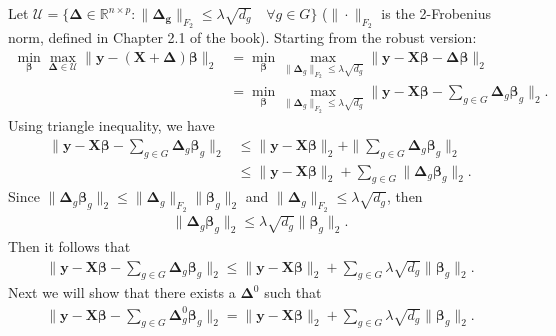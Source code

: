 \documentclass{article}%
\begin{document}
\begin{solution}
Let $\mathcal{U} = \{\mathbf{\Delta} \in \mathbb{R}^{n \times p}: \| \mathbf{\Delta_g} \| _{F_2} \leq \lambda \sqrt{d_g} \quad \forall g \in G \} $ ($\| \cdot \|_{F_2} $ is the 2-Frobenius norm, defined in Chapter 2.1 of the book).
Starting from the robust version:
\begin{align} 
    \min_{\boldsymbol{\beta}} \max_{ \mathbf{\Delta} \in \mathcal{U}} 
    \| \mathbf{y} - (\mathbf{X} + \mathbf{\Delta} )\boldsymbol{\beta} \|_2  
    &= \min_{\boldsymbol{\beta}} \max_{\|\mathbf{\Delta}_g\|_{F_2} \le \lambda \sqrt{d_g}} \|\mathbf{y} - \mathbf{X}\boldsymbol{\beta}  - \mathbf{\Delta}\boldsymbol{\beta}\|_2 \\
    &= \min_{\boldsymbol{\beta}} \max_{\|\mathbf{\Delta}_g\|_{F_2} \le \lambda \sqrt{d_g}} \|\mathbf{y} - \mathbf{X}\boldsymbol{\beta}  - \sum_{g \in G}\mathbf{\Delta}_g\boldsymbol{\beta}_g\|_2. \label{eq:rob_el}
\end{align}
Using triangle inequality, we have 
\begin{align}
    \|\mathbf{y} - \mathbf{X}\boldsymbol{\beta}  - \sum_{g \in G}\mathbf{\Delta}_g\boldsymbol{\beta}_g\|_2 
    & \le \|\mathbf{y} - \mathbf{X}\boldsymbol{\beta} \|_2 + \| \sum_{g \in G}\mathbf{\Delta}_g\boldsymbol{\beta}_g\|_2  \\
    & \le  \|\mathbf{y} - \mathbf{X}\boldsymbol{\beta} \|_2 +  \sum_{g \in G} \|\mathbf{\Delta}_g\boldsymbol{\beta}_g\|_2.
\end{align}
Since $\|\mathbf{\Delta}_g \boldsymbol{\beta}_g \|_2 \le \|\mathbf{\Delta}_g\|_{F_2} \|\boldsymbol{\beta}_g\|_2 $ and $\|\mathbf{\Delta}_g\|_{F_2} \le \lambda\sqrt{d_g}$, then 
\begin{align}
    \|\mathbf{\Delta}_g\boldsymbol{\beta}_g\|_2 \le \lambda\sqrt{d_g}\| \boldsymbol{\beta}_g\|_2.
\end{align}
Then it follows that 
\begin{align}
    \|\mathbf{y} - \mathbf{X}\boldsymbol{\beta}  - \sum_{g \in G}\mathbf{\Delta}_g\boldsymbol{\beta}_g\|_2  \le \|\mathbf{y} - \mathbf{X}\boldsymbol{\beta} \|_2 + \sum_{g \in G}\lambda\sqrt{d_g}\| \boldsymbol{\beta}_g\|_2.
\end{align}
Next we will show that there exists a $\mathbf{\Delta}^0$ such that 
\begin{align}
    \|\mathbf{y} - \mathbf{X}\boldsymbol{\beta}  - \sum_{g \in G}\mathbf{\Delta}^0_g\boldsymbol{\beta}_g\|_2  = \|\mathbf{y} - \mathbf{X}\boldsymbol{\beta} \|_2 + \sum_{g \in G}\lambda\sqrt{d_g}\| \boldsymbol{\beta}_g\|_2. 

\end{align}
\end{solution}
\end{document}
